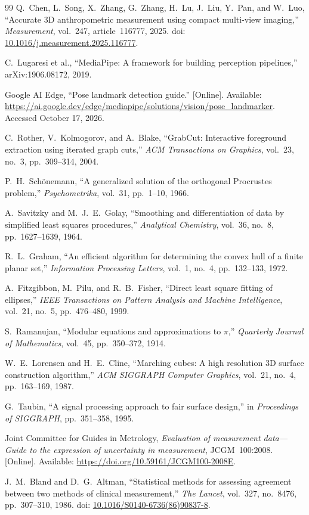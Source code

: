 \documentclass[11pt,a4paper]{article}
\begin{document}
\begin{thebibliography}{99}
Q.~Chen, L.~Song, X.~Zhang, G.~Zhang, H.~Lu, J.~Liu, Y.~Pan, and W.~Luo, ``Accurate 3D anthropometric measurement using compact multi-view imaging,'' \emph{Measurement}, vol.~247, article~116777, 2025. doi: \href{https://doi.org/10.1016/j.measurement.2025.116777}{10.1016/j.measurement.2025.116777}.

C.~Lugaresi et al., ``MediaPipe: A framework for building perception pipelines,'' arXiv:1906.08172, 2019.

Google AI Edge, ``Pose landmark detection guide.'' [Online]. Available: \url{https://ai.google.dev/edge/mediapipe/solutions/vision/pose_landmarker}. Accessed October 17, 2026.

C.~Rother, V.~Kolmogorov, and A.~Blake, ``GrabCut: Interactive foreground extraction using iterated graph cuts,'' \emph{ACM Transactions on Graphics}, vol.~23, no.~3, pp.~309--314, 2004.

P.~H.~Sch\"onemann, ``A generalized solution of the orthogonal Procrustes problem,'' \emph{Psychometrika}, vol.~31, pp.~1--10, 1966.

A.~Savitzky and M.~J.~E.~Golay, ``Smoothing and differentiation of data by simplified least squares procedures,'' \emph{Analytical Chemistry}, vol.~36, no.~8, pp.~1627--1639, 1964.

R.~L.~Graham, ``An efficient algorithm for determining the convex hull of a finite planar set,'' \emph{Information Processing Letters}, vol.~1, no.~4, pp.~132--133, 1972.

A.~Fitzgibbon, M.~Pilu, and R.~B.~Fisher, ``Direct least square fitting of ellipses,'' \emph{IEEE Transactions on Pattern Analysis and Machine Intelligence}, vol.~21, no.~5, pp.~476--480, 1999.

S.~Ramanujan, ``Modular equations and approximations to $\pi$,'' \emph{Quarterly Journal of Mathematics}, vol.~45, pp.~350--372, 1914.

W.~E.~Lorensen and H.~E.~Cline, ``Marching cubes: A high resolution 3D surface construction algorithm,'' \emph{ACM SIGGRAPH Computer Graphics}, vol.~21, no.~4, pp.~163--169, 1987.

G.~Taubin, ``A signal processing approach to fair surface design,'' in \emph{Proceedings of SIGGRAPH}, pp.~351--358, 1995.

Joint Committee for Guides in Metrology, \emph{Evaluation of measurement data---Guide to the expression of uncertainty in measurement}, JCGM~100:2008. [Online]. Available: \url{https://doi.org/10.59161/JCGM100-2008E}.

J.~M.~Bland and D.~G.~Altman, ``Statistical methods for assessing agreement between two methods of clinical measurement,'' \emph{The Lancet}, vol.~327, no.~8476, pp.~307--310, 1986. doi: \href{https://doi.org/10.1016/S0140-6736(86)90837-8}{10.1016/S0140-6736(86)90837-8}.
\end{thebibliography}
\end{document}
